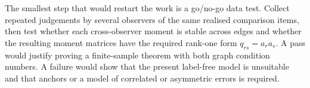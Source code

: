 \documentclass{article}
\begin{document}
The smallest step that would restart the work is a go/no-go data test.  Collect repeated judgements by several observers of the same realised comparison items, then test whether each cross-observer moment is stable across edges and whether the resulting moment matrices have the required rank-one form $q_{rs}=a_ra_s$.  A pass would justify proving a finite-sample theorem with both graph condition numbers.  A failure would show that the present label-free model is unsuitable and that anchors or a model of correlated or asymmetric errors is required.



\end{document}
